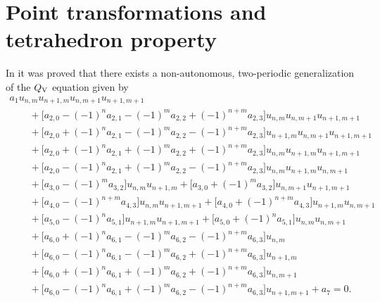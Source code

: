 \documentclass[pdftex]{sigma}
\numberwithin{equation}{section}
\newcommand{\QV}{Q_{\rm V}}
\begin{document}
\section{Point transformations and tetrahedron property}\label{sec:qvmobius}

In \cite{GSL_QV} it was proved that there exists a non-autonomous, two-periodic generalization of the $\QV$ equation \cite{Viallet2009} given by
\begin{gather}
 a_{1} u_{{n,m}}u_{{n+1,m}}u_{{n,m+1}}u_{{n+1,m+1}}
 \nonumber\\
 \qquad{} + \big[ { a_{2,0}}- ( -1 ) ^{n}{ a_{2,1}}
 - ( -1 ) ^{m}{a_{2,2}}+ ( -1 ) ^{n+m}{ a_{2,3}}\big] u_{{n,m}}u_{{n,m+1}}u_{{n+1,m+1}}\nonumber \\
\qquad{} + \big[ { a_{2,0}}+( -1 ) ^{n}{ a_{2,1}}- ( -1 ) ^{m}{ a_{2,2}}-
 ( -1 ) ^{n+m}{ a_{2,3}} \big]
 u_{{n+1,m}}u_{{n,m+1}}u_{{n+1,m+1}}\nonumber \\
\qquad{} + \big[ { a_{2,0}}+ ( -1 ) ^{n}{ a_{2,1}}
 + ( -1 ) ^{m}{ a_{2,2}}+ ( -1 ) ^{n+m}{ a_{2,3}} \big]
 u_{{n,m}}u_{{n+1,m}}u_{{n+1,m+1}}\nonumber \\
 \qquad{} + \big[ { a_{2,0}}- ( -1 ) ^{n}{a_{2,1}}+ ( -1 ) ^{m}{ a_{2,2}}
 - ( -1 ) ^{n+m}{ a_{2,3}} \big]
 u_{{n,m}}u_{{n+1,m}}u_{{n,m+1}}\nonumber \\
 \qquad{} + \big[ { a_{3,0}}- ( -1 ) ^{m}{ a_{3,2}} \big] u_{{n,m}}u_{{n+1,m}}
 + \big[ { a_{3,0}}+ ( -1 ) ^{m}{ a_{3,2}} \big] u_{{n,m+1}}u_{{n+1,m+1}}\nonumber \\
 \qquad{} + \big[ { a_{4,0}}- ( -1) ^{n+m}{ a_{4,3}} \big] u_{{n,m}}u_{{n+1,m+1}}
 + \big[ { a_{4,0}}+ ( -1 ) ^{n+m}{ a_{4,3}} \big] u_{{n+1,m}}u_{{n,m+1}}\nonumber \\
 \qquad{} + \big[ { a_{5,0}}- ( -1 ) ^{n}{ a_{5,1}} \big] u_{{n+1,m}}u_{{n+1,m+1}}
 + \big[ { a_{5,0}}+ ( -1 ) ^{n}{ a_{5,1}} \big] u_{{n,m}}u_{{n,m+1}}\nonumber \\
 \qquad{} + \big[ { a_{6,0}}+ ( -1 ) ^{n}{ a_{6,1}}-
 ( -1 ) ^{m}{ a_{6,2}}- ( -1 ) ^{n+m}{ a_{6,3}} \big] u_{{n,m}}\nonumber \\
 \qquad{} + \big[ { a_{6,0}}- ( -1 ) ^{n}{ a_{6,1}}
 - ( -1 ) ^{m}{ a_{6,2}}+ ( -1 ) ^{n+m}{ a_{6,3}} \big] u_{{n+1,m}}\nonumber \\
\qquad{} + \big[ { a_{6,0}}+ ( -1 ) ^{n}{ a_{6,1}}
 + ( -1 ) ^{m}{ a_{6,2}}+ ( -1 ) ^{n+m}{ a_{6,3}} \big] u_{{n,m+1}}\nonumber \\
 \qquad{}+ \big[ { a_{6,0}}- ( -1 ) ^{n}{ a_{6,1}}
 + ( -1 ) ^{m}{ a_{6,2}}- ( -1 ) ^{n+m}{ a_{6,3}}\big] u_{{n+1,m+1}}
 +a_{7}=0. \label{eq:naqv}
\end{gather}
\end{document}
